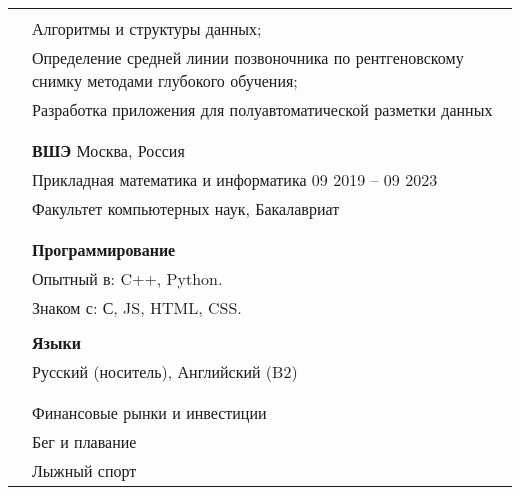 \documentclass[letterpaper, 11pt]{article}
\begin{document}
\begin{longtable}{p{1.3in}p{4.8in}}


\nohyphens{\color{OliveGreen}{Исследовательские интересы}}
& \\
& Алгоритмы и структуры данных; \\
& Определение средней линии позвоночника по рентгеновскому снимку методами глубокого обучения; \\
& Разработка приложения для полуавтоматической разметки данных \\
& \\


\color{OliveGreen}{Образование} 
& \\
& \textbf{ВШЭ} \hfill Москва, Россия \\ 
& Прикладная математика и информатика \hfill 09 2019 -- 09 2023 \\
& Факультет компьютерных наук, Бакалавриат \\
& \\





{\color{OliveGreen}{Навыки}} 
& \\
& \textbf{Программирование}\\
& Опытный в: C++, Python. \\
& Знаком с: С, JS, HTML, CSS. \\
& \\

& \textbf{Языки} \\
& Русский (носитель), Английский (B2) \\
& \\



\nohyphens{\color{OliveGreen}{Интересы}}
& \\
& Финансовые рынки и инвестиции \\
& Бег и плавание \\
& Лыжный спорт \\


\end{longtable}
\end{document}
